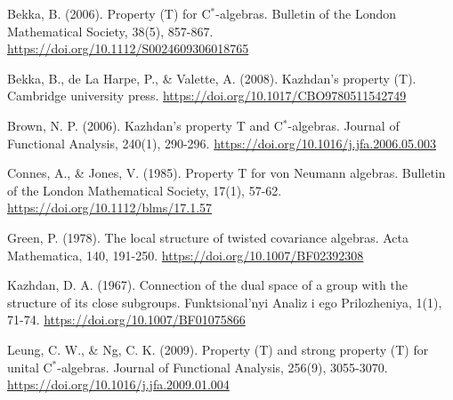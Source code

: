 \documentclass[12pt, reqno]{amsart}
\numberwithin{equation}{section}
\begin{document}

\begin{thebibliography}{99}

 Bekka, B. (2006). Property (T) for C$^*$-algebras. Bulletin of the London Mathematical Society, 38(5), 857-867.
\url{https://doi.org/10.1112/S0024609306018765}

  Bekka, B., de La Harpe, P., \& Valette, A. (2008). Kazhdan's property (T). Cambridge university press.
\url{https://doi.org/10.1017/CBO9780511542749}

 Brown, N. P. (2006). Kazhdan's property T and C$^*$-algebras. Journal of Functional Analysis, 240(1), 290-296.
\url{https://doi.org/10.1016/j.jfa.2006.05.003}


  Connes, A., \& Jones, V. (1985). Property T for von Neumann algebras. Bulletin of the London Mathematical Society, 17(1), 57-62.
\url{https://doi.org/10.1112/blms/17.1.57}

  Green, P. (1978). The local structure of twisted covariance algebras. Acta Mathematica, 140, 191-250.
\url{https://doi.org/10.1007/BF02392308}

 Kazhdan, D. A. (1967). Connection of the dual space of a group with the structure of its close subgroups. Funktsional'nyi Analiz i ego Prilozheniya, 1(1), 71-74.
\url{https://doi.org/10.1007/BF01075866}

 Leung, C. W., \& Ng, C. K. (2009). Property (T) and strong property (T) for unital C$^*$-algebras. Journal of Functional Analysis, 256(9), 3055-3070.
\url{https://doi.org/10.1016/j.jfa.2009.01.004}



\end{thebibliography}
\end{document}
